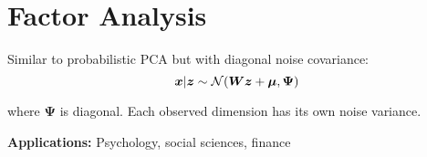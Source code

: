 
\section{Factor Analysis}
\label{sec:factor-analysis}

Similar to probabilistic PCA but with diagonal noise covariance:
\begin{equation}
\boldsymbol{x} | \boldsymbol{z} \sim \mathcal{N}(\boldsymbol{W}\boldsymbol{z} + \boldsymbol{\mu}, \boldsymbol{\Psi})
\end{equation}

where $\boldsymbol{\Psi}$ is diagonal. Each observed dimension has its own noise variance.

\textbf{Applications:} Psychology, social sciences, finance

